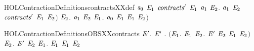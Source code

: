 \begin{SaveVerbatim}{HOLContractionDefinitionscontractsXXdef}
                     \ensuremath{\HOLBoundVar{a}\sb{\mathrm{0}}} \HOLTokenTransBegin\HOLConst{\ensuremath{\tau}}\HOLTokenTransEnd \ensuremath{\HOLBoundVar{E}\sb{\mathrm{1}}} \HOLSymConst{\HOLTokenImp{}}
                     \ensuremath{\HOLBoundVar{contracts}\sp{\prime}} \ensuremath{\HOLBoundVar{E}\sb{\mathrm{1}}} \ensuremath{\HOLBoundVar{a}\sb{\mathrm{1}}} \HOLSymConst{\HOLTokenDisj{}}
                     \HOLSymConst{\HOLTokenExists{}}\ensuremath{\HOLBoundVar{E}\sb{\mathrm{2}}}. \ensuremath{\HOLBoundVar{a}\sb{\mathrm{1}}} \HOLTokenTransBegin\HOLConst{\ensuremath{\tau}}\HOLTokenTransEnd \ensuremath{\HOLBoundVar{E}\sb{\mathrm{2}}} \HOLSymConst{\HOLTokenConj{}} \ensuremath{\HOLBoundVar{contracts}\sp{\prime}} \ensuremath{\HOLBoundVar{E}\sb{\mathrm{1}}} \ensuremath{\HOLBoundVar{E}\sb{\mathrm{2}}}\ensuremath{)} \HOLSymConst{\HOLTokenConj{}}
                \HOLSymConst{\HOLTokenForall{}}\ensuremath{\HOLBoundVar{E}\sb{\mathrm{2}}}.
                    \ensuremath{\HOLBoundVar{a}\sb{\mathrm{1}}} \HOLTokenTransBegin\HOLConst{\ensuremath{\tau}}\HOLTokenTransEnd \ensuremath{\HOLBoundVar{E}\sb{\mathrm{2}}} \HOLSymConst{\HOLTokenImp{}}
                    \HOLSymConst{\HOLTokenExists{}}\ensuremath{\HOLBoundVar{E}\sb{\mathrm{1}}}.  \ensuremath{\HOLBoundVar{a}\sb{\mathrm{0}}} \ensuremath{\HOLBoundVar{E}\sb{\mathrm{1}}} \HOLSymConst{\HOLTokenConj{}}  \ensuremath{\HOLBoundVar{E}\sb{\mathrm{1}}} \ensuremath{\HOLBoundVar{E}\sb{\mathrm{2}}}\ensuremath{)}
\end{SaveVerbatim}
\newcommand{\HOLContractionDefinitionscontractsXXdef}{\UseVerbatim{HOLContractionDefinitionscontractsXXdef}}
\begin{SaveVerbatim}{HOLContractionDefinitionsOBSXXcontracts}
\HOLTokenTurnstile{} \HOLSymConst{\HOLTokenForall{}} \ensuremath{\HOLBoundVar{E}\sp{\prime}}.
         \ensuremath{\HOLBoundVar{E}\sp{\prime}} \HOLSymConst{\HOLTokenEquiv{}}
       \HOLSymConst{\HOLTokenForall{}}.
           \ensuremath{(}\HOLSymConst{\HOLTokenForall{}}\ensuremath{\HOLBoundVar{E}\sb{\mathrm{1}}}.  \HOLTokenTransBegin{}\HOLTokenTransEnd \ensuremath{\HOLBoundVar{E}\sb{\mathrm{1}}} \HOLSymConst{\HOLTokenImp{}} \HOLSymConst{\HOLTokenExists{}}\ensuremath{\HOLBoundVar{E}\sb{\mathrm{2}}}. \ensuremath{\HOLBoundVar{E}\sp{\prime}} \HOLTokenTransBegin{}\HOLTokenTransEnd \ensuremath{\HOLBoundVar{E}\sb{\mathrm{2}}} \HOLSymConst{\HOLTokenConj{}} \ensuremath{\HOLBoundVar{E}\sb{\mathrm{1}}}  \ensuremath{\HOLBoundVar{E}\sb{\mathrm{2}}}\ensuremath{)} \HOLSymConst{\HOLTokenConj{}}
           \HOLSymConst{\HOLTokenForall{}}\ensuremath{\HOLBoundVar{E}\sb{\mathrm{2}}}. \ensuremath{\HOLBoundVar{E}\sp{\prime}} \HOLTokenTransBegin{}\HOLTokenTransEnd \ensuremath{\HOLBoundVar{E}\sb{\mathrm{2}}} \HOLSymConst{\HOLTokenImp{}} \HOLSymConst{\HOLTokenExists{}}\ensuremath{\HOLBoundVar{E}\sb{\mathrm{1}}}.  \HOLTokenWeakTransBegin{}\HOLTokenWeakTransEnd \ensuremath{\HOLBoundVar{E}\sb{\mathrm{1}}} \HOLSymConst{\HOLTokenConj{}}  \ensuremath{\HOLBoundVar{E}\sb{\mathrm{1}}} \ensuremath{\HOLBoundVar{E}\sb{\mathrm{2}}}
\end{SaveVerbatim}
